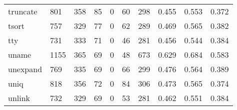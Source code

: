 \begin{longtable}{lp{1.3cm}p{1.3cm}p{1.3cm}p{1.3cm}p{1.3cm}p{1.3cm}p{1.3cm}p{1.3cm}p{1.3cm}}
truncate  &                    801 &                                358 &                                85 &                                0 &                                60 &                             298 &                                0.455 &                                  0.553 &                                0.372 \\
tsort     &                    757 &                                329 &                                77 &                                0 &                                62 &                             289 &                                0.469 &                                  0.565 &                                0.382 \\
tty       &                    731 &                                333 &                                71 &                                0 &                                46 &                             281 &                                0.456 &                                  0.544 &                                0.384 \\
uname     &                   1155 &                                365 &                                69 &                                0 &                                48 &                             673 &                                0.629 &                                  0.684 &                                0.583 \\
unexpand  &                    769 &                                335 &                                69 &                                0 &                                66 &                             299 &                                0.476 &                                  0.564 &                                0.389 \\
uniq      &                    818 &                                356 &                                72 &                                0 &                                84 &                             306 &                                0.473 &                                  0.565 &                                0.374 \\
unlink    &                    732 &                                329 &                                69 &                                0 &                                53 &                             281 &                                0.462 &                                  0.551 &                                0.384 \\

\end{longtable}
